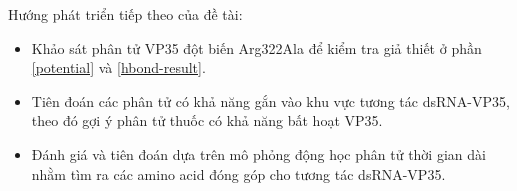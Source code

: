 \documentclass[12pt,a4paper,reqno, oneside]{book}
\begin{document}
	Hướng phát triển tiếp theo của đề tài:
	\begin{itemize}
	\item Khảo sát phân tử VP35 đột biến Arg322Ala để kiểm tra giả thiết ở phần \ref{potential} và \ref{hbond-result}.
	\item Tiên đoán các phân tử có khả năng gắn vào khu vực tương tác dsRNA-VP35, theo đó gợi ý phân tử thuốc có khả năng bất hoạt VP35.
	\item Đánh giá và tiên đoán dựa trên mô phỏng động học phân tử thời gian dài nhằm tìm ra các amino acid đóng góp cho tương tác dsRNA-VP35.
	\end{itemize}
	


\printbibliography
{}
\clearpage





\appendix
{}
\clearpage
\newpage

\newpage


\end{document}
